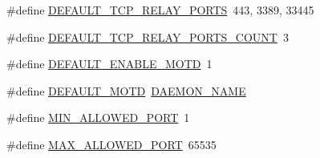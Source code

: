 \begin{DoxyCompactItemize}
\#define \hyperlink{tox-bootstrapd_8c_a2d597b4c5dbb34d2f7e5387e8aa8d13d}{D\+E\+F\+A\+U\+L\+T\+\_\+\+T\+C\+P\+\_\+\+R\+E\+L\+A\+Y\+\_\+\+P\+O\+R\+T\+S}~443, 3389, 33445
\item 
\#define \hyperlink{tox-bootstrapd_8c_a8cd528f2dfb339311387dcb43608ceef}{D\+E\+F\+A\+U\+L\+T\+\_\+\+T\+C\+P\+\_\+\+R\+E\+L\+A\+Y\+\_\+\+P\+O\+R\+T\+S\+\_\+\+C\+O\+U\+N\+T}~3
\item 
\#define \hyperlink{tox-bootstrapd_8c_a1014d7c1334195d6330fb4b7d05d210c}{D\+E\+F\+A\+U\+L\+T\+\_\+\+E\+N\+A\+B\+L\+E\+\_\+\+M\+O\+T\+D}~1
\item 
\#define \hyperlink{tox-bootstrapd_8c_a91de4e54937ebc70859c64e252a85941}{D\+E\+F\+A\+U\+L\+T\+\_\+\+M\+O\+T\+D}~\hyperlink{tox-bootstrapd_8c_a5ea777c6fb1dd39fda46cdf97a6949a5}{D\+A\+E\+M\+O\+N\+\_\+\+N\+A\+M\+E}
\item 
\#define \hyperlink{tox-bootstrapd_8c_a3ef213aa33f9321104faf75dfe823623}{M\+I\+N\+\_\+\+A\+L\+L\+O\+W\+E\+D\+\_\+\+P\+O\+R\+T}~1
\item 
\#define \hyperlink{tox-bootstrapd_8c_a83828e6f5b4b788b1781b298a3a221cd}{M\+A\+X\+\_\+\+A\+L\+L\+O\+W\+E\+D\+\_\+\+P\+O\+R\+T}~65535
\end{DoxyCompactItemize}

